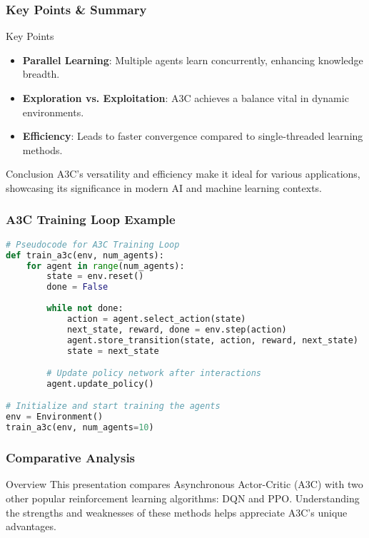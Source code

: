 \documentclass{beamer}
\begin{document}
\begin{frame}[fragile]
    \frametitle{Key Points \& Summary}
    \begin{block}{Key Points}
        \begin{itemize}
            \item \textbf{Parallel Learning}: Multiple agents learn concurrently, enhancing knowledge breadth.
            \item \textbf{Exploration vs. Exploitation}: A3C achieves a balance vital in dynamic environments.
            \item \textbf{Efficiency}: Leads to faster convergence compared to single-threaded learning methods.
        \end{itemize}
    \end{block}
    
    \begin{block}{Conclusion}
        A3C's versatility and efficiency make it ideal for various applications, showcasing its significance in modern AI and machine learning contexts.
    \end{block}
\end{frame}

\begin{frame}[fragile]
    \frametitle{A3C Training Loop Example}
    \begin{lstlisting}[language=Python]
# Pseudocode for A3C Training Loop
def train_a3c(env, num_agents):
    for agent in range(num_agents):
        state = env.reset()
        done = False
        
        while not done:
            action = agent.select_action(state)
            next_state, reward, done = env.step(action)
            agent.store_transition(state, action, reward, next_state)
            state = next_state

        # Update policy network after interactions
        agent.update_policy()

# Initialize and start training the agents
env = Environment()
train_a3c(env, num_agents=10)
    \end{lstlisting}
\end{frame}

\begin{frame}[fragile]
    \frametitle{Comparative Analysis}
    \begin{block}{Overview}
        This presentation compares Asynchronous Actor-Critic (A3C) with two other popular reinforcement learning algorithms: DQN and PPO. Understanding the strengths and weaknesses of these methods helps appreciate A3C’s unique advantages.
    \end{block}
\end{frame}
\end{document}
